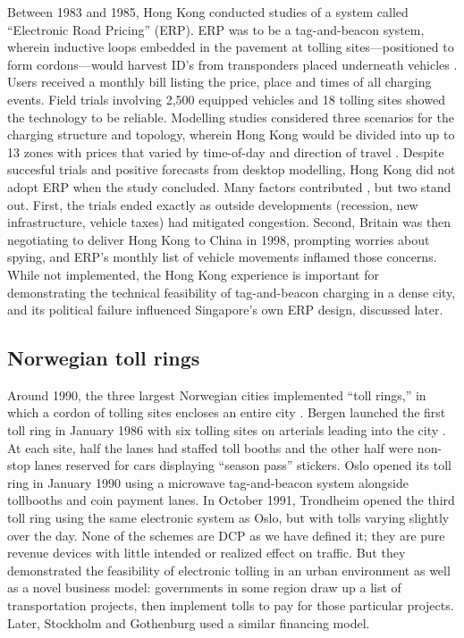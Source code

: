  Between 1983 and 1985, Hong Kong conducted studies of a system called ``Electronic Road Pricing'' (ERP). ERP was to be a tag-and-beacon system, wherein inductive loops embedded in the pavement at tolling sites---positioned to form cordons---would harvest ID's from transponders placed underneath vehicles \citep{Dawson1986}. Users received a monthly bill listing the price, place and times of all charging events. Field trials involving 2,500 equipped vehicles and 18 tolling sites showed the technology to be reliable. Modelling studies considered three scenarios for the charging structure and topology, wherein Hong Kong would be divided into up to 13 zones with prices that varied by time-of-day and direction of travel \citep[Table 11, p. 23]{Gomez-Ibanez1994}.  Despite succesful trials and positive forecasts from desktop modelling, Hong Kong did not adopt ERP when the study concluded. Many factors contributed \citep{Hau1990,Borins1988}, but two stand out. First, the trials ended exactly as outside developments (recession, new infrastructure, vehicle taxes) had mitigated congestion. Second, Britain was then negotiating to deliver Hong Kong to China in 1998, prompting worries about spying, and  ERP's monthly list of vehicle movements inflamed those concerns. While not implemented, the Hong Kong experience is important for demonstrating the technical feasibility of tag-and-beacon charging in a dense city, and its political failure influenced Singapore's own ERP design, discussed later.

\subsection{Norwegian toll rings}

Around 1990, the three largest Norwegian cities implemented ``toll rings,'' in which a cordon of tolling sites encloses an entire city \citep{Ieromonachou2006,Ramjerdi2004}. 
Bergen launched the first toll ring in January 1986 with six tolling sites on arterials leading into the city . At each site, half the lanes had staffed toll booths and the other half were non-stop lanes reserved for cars displaying ``season pass'' stickers. Oslo opened its toll ring in January 1990 using a microwave tag-and-beacon system alongside tollbooths and coin payment lanes. In October 1991, Trondheim opened the third toll ring using the same electronic system as Oslo, but with tolls varying slightly over the day. None of the schemes are DCP as we have defined it; they are pure revenue devices with little intended or realized effect on traffic. But they demonstrated the feasibility of electronic tolling in an urban environment as well as a novel business model: governments in some region draw up a list of transportation projects, then implement tolls to pay for those particular projects. Later, Stockholm and Gothenburg used a similar financing model.

